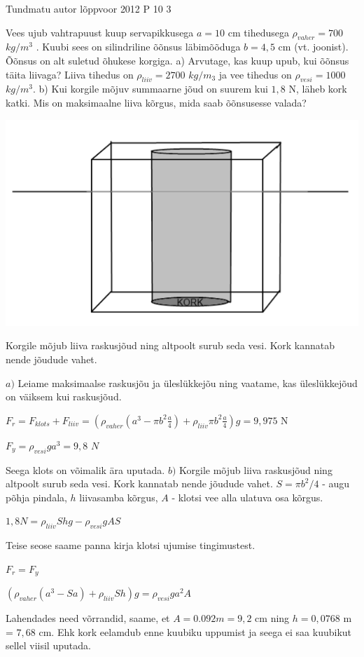 {Tundmatu autor} %
{lõppvoor} %
{2012} %
{P 10} %
{3} %
{

\ifStatement
Vees ujub vahtrapuust kuup servapikkusega $a = 10$ cm tihedusega $\rho_{vaher} = 700$ $kg/m^3$ . Kuubi sees on silindriline õõnsus läbimõõduga $b = 4,5$ cm (vt. joonist). Õõnsus on alt suletud õhukese korgiga. 
a) Arvutage, kas kuup upub, kui õõnsus täita liivaga? Liiva tihedus on $\rho_{liiv} = 2700$ $kg/m_3$ ja vee tihedus on $\rho_{vesi} = 1000$ $kg/m^3$. 
b) Kui korgile mõjuv summaarne jõud on suurem kui $1,8$ N, läheb kork katki. 
Mis on maksimaalne liiva kõrgus, mida saab õõnsusesse valada?
\begin{center}
	\includegraphics[width=0.5\linewidth]{2012-v3p-10-yl.PNG}
\end{center}
\fi

\ifHint
Korgile mõjub liiva raskusjõud ning altpoolt surub seda vesi. Kork kannatab nende jõudude vahet.
\fi

\ifSolution
$a)$ Leiame maksimaalse raskusjõu ja üleslükkejõu ning vaatame, kas üleslükkejõud on väiksem kui raskusjõud.
\begin{center}
$F_r = F_{klots} + F_{liiv} = (\rho_{vaher}(a^3 - \pi b^2 \frac{a}{4}) + \rho_{liiv} \pi b^2 \frac{a}{4})g = 9,975$ N
\end{center}
\begin{center}
$F_y = \rho_{vesi} ga^3 = 9,8$ $N$
\end{center}
Seega klots on võimalik ära uputada.
\newline
$b)$ Korgile mõjub liiva raskusjõud ning altpoolt surub seda vesi. Kork kannatab nende jõudude vahet. $S = \pi b^2/4$ - augu põhja pindala, $h$ liivasamba kõrgus, $A$ - klotsi vee alla ulatuva osa kõrgus.
\begin{center}
$1, 8 N = \rho_{liiv}Shg - \rho_{vesi}g AS$
\end{center}
Teise seose saame panna kirja klotsi ujumise tingimustest.
\begin{center}
$F_r = F_y$
\end{center}
\begin{center}
$(\rho_{vaher}(a^3 - Sa) + \rho_{liiv} Sh)g = \rho_{vesi}ga^2 A$
\end{center}
Lahendades need võrrandid, saame, et $A = 0.092m = 9,2$ cm ning $h = 0,0768$ m = $7,68$ cm. Ehk kork eelamdub enne kuubiku uppumist ja seega ei saa kuubikut sellel viisil uputada.
\fi
}